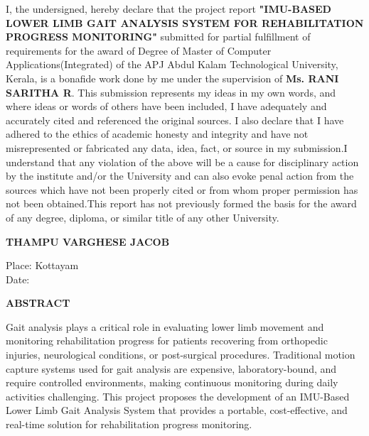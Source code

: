\documentclass[12pt,a4paper]{report}
\begin{document}
I, the undersigned, hereby declare that the project report
\textbf{"IMU-BASED LOWER LIMB GAIT ANALYSIS SYSTEM FOR REHABILITATION PROGRESS MONITORING"} submitted for partial
fulfillment of requirements for the award of Degree of Master of Computer Applications(Integrated) of the APJ Abdul Kalam Technological University, Kerala,
is a bonafide work done by me under the supervision of
\textbf{Ms. RANI SARITHA R}. This submission represents my ideas in my own words, and where ideas or words of others have been included, I have adequately and accurately cited and referenced the original sources. I also declare that I have adhered to the ethics of academic honesty and integrity and have not misrepresented or fabricated any data, idea, fact, or source in my submission.I understand that any violation of the above will be a cause for disciplinary action by the institute and/or the University and can also evoke penal action from the sources which have not been properly cited or from whom proper permission has not been obtained.This report has not previously formed the basis for the award of any degree, diploma, or similar title of any other University.

\vspace{2cm}

\begin{flushright}
\textbf{THAMPU VARGHESE JACOB}
\end{flushright}

\noindent
Place: Kottayam\\
Date:


\newpage
\thispagestyle{empty}

\begin{center}
{\fontsize{16pt}{18pt}\selectfont\textbf{ABSTRACT}}
\end{center}

\vspace{1cm}
Gait analysis plays a critical role in evaluating lower limb movement and monitoring rehabilitation progress for patients recovering from orthopedic injuries, neurological conditions, or post-surgical procedures. Traditional motion capture systems used for gait analysis are expensive, laboratory-bound, and require controlled environments, making continuous monitoring during daily activities challenging. This project proposes the development of an IMU-Based Lower Limb Gait Analysis System that provides a portable, cost-effective, and real-time solution for rehabilitation progress monitoring.
\end{document}

